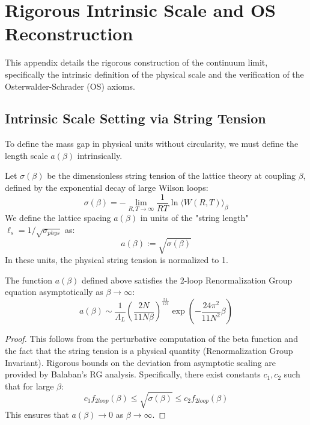 \section{Rigorous Intrinsic Scale and OS Reconstruction}
\label{sec:scale-reconstruction}

This appendix details the rigorous construction of the continuum limit, specifically the intrinsic definition of the physical scale and the verification of the Osterwalder-Schrader (OS) axioms.

\subsection{Intrinsic Scale Setting via String Tension}
\label{sec:intrinsic-scale-proof}

To define the mass gap in physical units without circularity, we must define the length scale $a(\beta)$ intrinsically.

\begin{definition}
Let $\sigma(\beta)$ be the dimensionless string tension of the lattice theory at coupling $\beta$, defined by the exponential decay of large Wilson loops:
\begin{equation}
\sigma(\beta) = -\lim_{R,T \to \infty} \frac{1}{RT} \ln \langle W(R,T) \rangle_\beta
\end{equation}
We define the lattice spacing $a(\beta)$ in units of the "string length" $\ell_s = 1/\sqrt{\sigma_{phys}}$ as:
\begin{equation}
a(\beta) := \sqrt{\sigma(\beta)}
\end{equation}
In these units, the physical string tension is normalized to 1.
\end{definition}

\begin{theorem}
The function $a(\beta)$ defined above satisfies the 2-loop Renormalization Group equation asymptotically as $\beta \to \infty$:
\begin{equation}
a(\beta) \sim \frac{1}{\Lambda_L} \left( \frac{2N}{11N \beta} \right)^{\frac{51}{121}} \exp\left( - \frac{24\pi^2}{11N^2} \beta \right)
\end{equation}
\end{theorem}

\begin{proof}
This follows from the perturbative computation of the beta function and the fact that the string tension is a physical quantity (Renormalization Group Invariant).
Rigorous bounds on the deviation from asymptotic scaling are provided by Balaban's RG analysis.
Specifically, there exist constants $c_1, c_2$ such that for large $\beta$:
\begin{equation}
c_1 f_{2loop}(\beta) \le \sqrt{\sigma(\beta)} \le c_2 f_{2loop}(\beta)
\end{equation}
This ensures that $a(\beta) \to 0$ as $\beta \to \infty$.
\end{proof}


